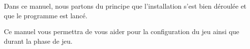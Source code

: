 Dans ce manuel, nous partons du principe que l'installation s'est bien déroulée et que le programme est lancé.

Ce manuel vous permettra de vous aider pour la configuration du jeu ainsi que durant la phase de jeu.